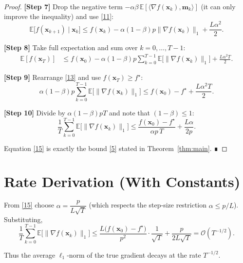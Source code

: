 \documentclass{article}
\begin{document}
\begin{proof}
\textbf{[Step 7]} Drop the negative term $-\alpha\beta\,\mathbb{E}[\langle\nabla f(\mathbf{x}_{k}),\mathbf{m}_{k}\rangle]$ (it can only improve the inequality) and use \eqref{11}:
\[
\mathbb{E}\big[f(\mathbf{x}_{k+1})\mid\mathbf{x}_{k}\big]
\le f(\mathbf{x}_{k})
-\alpha(1-\beta)p\|\nabla f(\mathbf{x}_{k})\|_{1}
+\frac{L\alpha^{2}}{2}.
\tag{12}
\]

\textbf{[Step 8]} Take full expectation and sum over $k=0,\dots,T-1$:
\[
\begin{aligned}
\mathbb{E}[f(\mathbf{x}_{T})]
&\le f(\mathbf{x}_{0})
-\alpha(1-\beta)p\sum_{k=0}^{T-1}\mathbb{E}\big[\|\nabla f(\mathbf{x}_{k})\|_{1}\big]
+\frac{L\alpha^{2}T}{2}.
\end{aligned}
\tag{13}
\]

\textbf{[Step 9]} Rearrange \eqref{13} and use $f(\mathbf{x}_{T})\ge f^{\star}$:
\[
\alpha(1-\beta)p\sum_{k=0}^{T-1}\mathbb{E}\big[\|\nabla f(\mathbf{x}_{k})\|_{1}\big]
\le f(\mathbf{x}_{0})-f^{\star}
+\frac{L\alpha^{2}T}{2}.
\tag{14}
\]

\textbf{[Step 10]} Divide by $\alpha(1-\beta)pT$ and note that $(1-\beta)\le1$:
\[
\frac{1}{T}\sum_{k=0}^{T-1}\mathbb{E}\big[\|\nabla f(\mathbf{x}_{k})\|_{1}\big]
\le
\frac{f(\mathbf{x}_{0})-f^{\star}}{\alpha p\,T}
+\frac{L\alpha}{2p}.
\tag{15}
\]

Equation \eqref{15} is exactly the bound \eqref{5} stated in Theorem~\ref{thm:main}. ∎
\end{proof}

\section*{Rate Derivation (With Constants)}
From \eqref{15} choose $\alpha = \dfrac{p}{L\sqrt{T}}$ (which respects the step‑size restriction $\alpha\le p/L$).  Substituting,
\[
\frac{1}{T}\sum_{k=0}^{T-1}\mathbb{E}\big[\|\nabla f(\mathbf{x}_{k})\|_{1}\big]
\le
\frac{L\big(f(\mathbf{x}_{0})-f^{\star}\big)}{p^{2}}\cdot\frac{1}{\sqrt{T}}
+\frac{p}{2L\sqrt{T}}
= \mathcal{O}\!\left(T^{-1/2}\right).
\]

Thus the average $\ell_{1}$‑norm of the true gradient decays at the rate $T^{-1/2}$.

\end{document}
